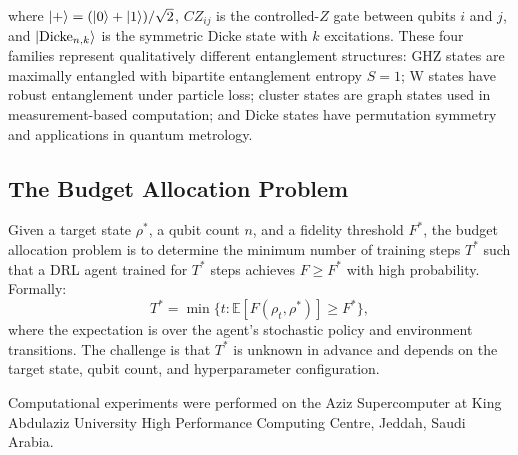 \documentclass[twocolumn,superscriptaddress]{quantumarticle}
\begin{document}
where $\ket{+} = (\ket{0}+\ket{1})/\sqrt{2}$, $CZ_{ij}$ is the controlled-$Z$ gate
between qubits $i$ and $j$, and $\ket{\mathrm{Dicke}_{n,k}}$ is the symmetric Dicke
state with $k$ excitations. These four families represent qualitatively different
entanglement structures: GHZ states are maximally entangled with bipartite entanglement
entropy $S = 1$; W states have robust entanglement under particle loss; cluster states
are graph states used in measurement-based computation; and Dicke states have
permutation symmetry and applications in quantum metrology.

\subsection{The Budget Allocation Problem}

Given a target state $\rho^*$, a qubit count $n$, and a fidelity threshold $F^*$,
the budget allocation problem is to determine the minimum number of training steps
$T^*$ such that a DRL agent trained for $T^*$ steps achieves $F \geq F^*$ with
high probability. Formally:
\begin{equation}
  T^* = \min\{t : \mathbb{E}[F(\rho_t, \rho^*)] \geq F^*\},
\end{equation}
where the expectation is over the agent's stochastic policy and environment
transitions. The challenge is that $T^*$ is unknown in advance and depends on
the target state, qubit count, and hyperparameter configuration.








\begin{acknowledgments}
Computational experiments were performed on the Aziz Supercomputer at King Abdulaziz
University High Performance Computing Centre, Jeddah, Saudi Arabia.
\end{acknowledgments}


\end{document}
